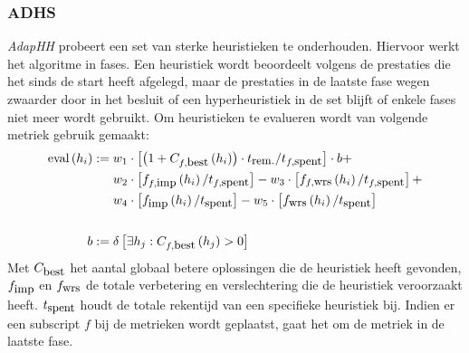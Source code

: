 \subsubsection{ADHS}
\emph{AdapHH} probeert een set van sterke heuristieken te onderhouden. Hiervoor werkt het algoritme in fases. Een heuristiek wordt beoordeelt volgens de prestaties die het sinds de start heeft afgelegd, maar de prestaties in de laatste fase wegen zwaarder door in het besluit of een hyperheuristiek in de set blijft of enkele fases niet meer wordt gebruikt. Om heuristieken te evalueren wordt van volgende metriek gebruik gemaakt:
\begin{align*}
\mbox{eval}\left(h_i\right):={}&w_1\cdot\left[\left(1+C_{f,\mbox{\small{best}}}\left(h_i\right)\right)\cdot t_{\mbox{\small{rem.}}}/t_{f,\mbox{\small{spent}}}\right]\cdot b+\\
&w_2\cdot\left[f_{f,\mbox{\small{imp}}}\left(h_i\right)/t_{f,\mbox{\small{spent}}}\right]-w_3\cdot\left[f_{f,\mbox{\small{wrs}}}\left(h_i\right)/t_{f,\mbox{\small{spent}}}\right]+\\
&w_4\cdot\left[f_{\mbox{\small{imp}}}\left(h_i\right)/t_{\mbox{\small{spent}}}\right]-w_5\cdot\left[f_{\mbox{\small{wrs}}}\left(h_i\right)/t_{\mbox{\small{spent}}}\right]\\\\
b:={}&\delta\left[\exists h_j:C_{f,\mbox{\small{best}}}\left(h_j\right)>0\right]
\end{align*}
Met $C_{\mbox{\small{best}}}$ het aantal globaal betere oplossingen die de heuristiek heeft gevonden, $f_{\mbox{\small{imp}}}$ en $f_{\mbox{\small{wrs}}}$ de totale verbetering en verslechtering die de heuristiek veroorzaakt heeft. $t_{\mbox{\small{spent}}}$ houdt de totale rekentijd van een specifieke heuristiek bij. Indien er een subscript $f$ bij de metrieken wordt geplaatst, gaat het om de metriek in de laatste fase.


